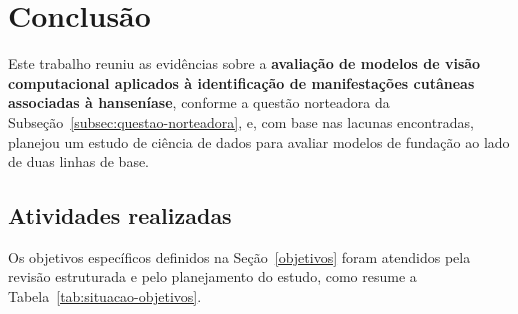 \chapter{Conclusão}
\label{cap:conclusoes}

Este trabalho reuniu as evidências sobre a \textbf{avaliação de modelos de visão
	computacional aplicados à identificação de manifestações cutâneas
	associadas à hanseníase}, conforme a questão norteadora da
Subseção~\ref{subsec:questao-norteadora}, e, com base nas lacunas
encontradas, planejou um estudo de ciência de dados para avaliar modelos de fundação
ao lado de duas linhas de base.

\section{Atividades realizadas}
\label{sec:atividades-realizadas}

Os objetivos específicos definidos na Seção~\ref{objetivos} foram
atendidos pela revisão estruturada e pelo planejamento do estudo, como
resume a Tabela~\ref{tab:situacao-objetivos}.

